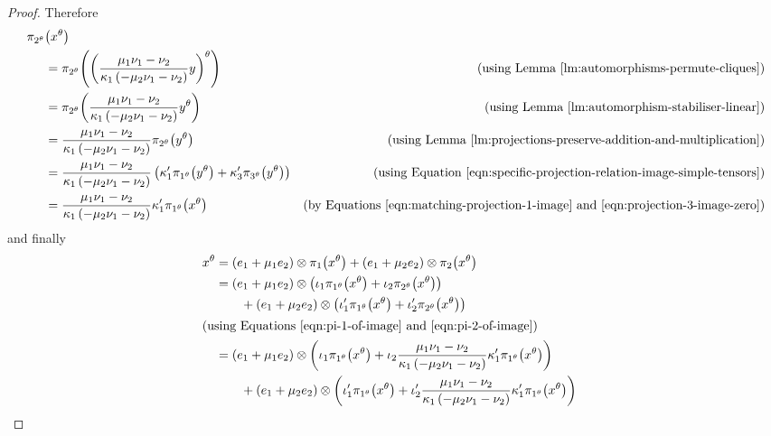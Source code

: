 \begin{proof}
Therefore
\begin{align}
    \pi_{2^\theta}&{\left(x^\theta \right)}  \notag \\
    &= \pi_{2^\theta}{\left(\left(\frac{\mu_1 \nu_1 - \nu_2}{\kappa_1 \left(-\mu_2 \nu_1 - \nu_2 \right)} y \right)^\theta \right)} &\text{(using Lemma~\ref{lm:automorphisms-permute-cliques})} \notag \\
    &= \pi_{2^\theta}{\left(\frac{\mu_1 \nu_1 - \nu_2}{\kappa_1 \left(-\mu_2 \nu_1 - \nu_2 \right)} y^\theta \right)} &\text{(using Lemma~\ref{lm:automorphism-stabiliser-linear})} \notag \\
    &= \frac{\mu_1 \nu_1 - \nu_2}{\kappa_1 \left(-\mu_2 \nu_1 - \nu_2 \right)} \pi_{2^\theta}{\left(y^\theta \right)} &\text{(using Lemma~\ref{lm:projections-preserve-addition-and-multiplication})} \notag \\
    &= \frac{\mu_1 \nu_1 - \nu_2}{\kappa_1 \left(-\mu_2 \nu_1 - \nu_2 \right)} \left(\kappa'_1 \pi_{1^\theta}{\left(y^\theta \right)} + \kappa'_3 \pi_{3^\theta}{\left(y^\theta \right)}\right) &\text{(using Equation \eqref{eqn:specific-projection-relation-image-simple-tensors})} \notag \\
    &= \frac{\mu_1 \nu_1 - \nu_2}{\kappa_1 \left(-\mu_2 \nu_1 - \nu_2 \right)} \kappa'_1 \pi_{1^\theta}{\left(x^\theta \right)} &\text{(by Equations \eqref{eqn:matching-projection-1-image} and \eqref{eqn:projection-3-image-zero})} \label{eqn:pi-2-image}
\end{align}
and finally
\begin{align*}
    x^\theta &= \left(e_1 + \mu_1 e_2 \right) \otimes \pi_1{\left(x^\theta \right)} + \left(e_1 + \mu_2 e_2 \right) \otimes \pi_2{\left(x^\theta \right)} \\
    &= \left(e_1 + \mu_1 e_2 \right) \otimes \left(\iota_1 \pi_{1^\theta}{\left(x^\theta \right)} + \iota_2 \pi_{2^\theta}{\left(x^\theta \right)}\right) \\
    &\ \ \ \ \ \ + \left(e_1 + \mu_2 e_2 \right) \otimes \left(\iota'_1 \pi_{1^\theta}{\left(x^\theta \right)} + \iota'_2 \pi_{2^\theta}{\left(x^\theta \right)}\right)  & \\
    \intertext{(using Equations \eqref{eqn:pi-1-of-image} and \eqref{eqn:pi-2-of-image})}
    &= \left(e_1 + \mu_1 e_2 \right) \otimes \left(\iota_1 \pi_{1^\theta}{\left(x^\theta \right)} + \iota_2 \frac{\mu_1 \nu_1 - \nu_2}{\kappa_1 \left(-\mu_2 \nu_1 - \nu_2 \right)} \kappa'_1 \pi_{1^\theta}{\left(x^\theta \right)}\right) \\
    &\ \ \ \ \ \ + \left(e_1 + \mu_2 e_2 \right) \otimes \left(\iota'_1 \pi_{1^\theta}{\left(x^\theta \right)} + \iota'_2 \frac{\mu_1 \nu_1 - \nu_2}{\kappa_1 \left(-\mu_2 \nu_1 - \nu_2 \right)} \kappa'_1 \pi_{1^\theta}{\left(x^\theta \right)}\right) & \\

\end{align*}
\end{proof}
